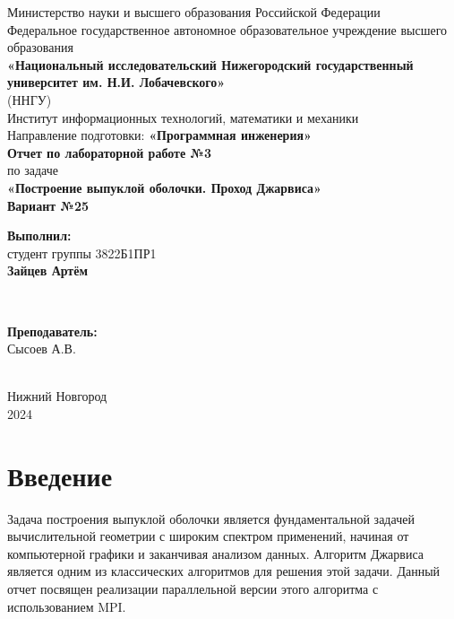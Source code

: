 \documentclass[12pt]{article}
\begin{document}
\begin{titlepage}
    \centering
    \large
    Министерство науки и высшего образования Российской Федерации\\[0.5cm]
    Федеральное государственное автономное образовательное учреждение высшего образования\\[0.5cm]
    \textbf{«Национальный исследовательский Нижегородский государственный университет им. Н.И. Лобачевского»}\\
    (ННГУ)\\[1cm]
    Институт информационных технологий, математики и механики\\[0.5cm]
    Направление подготовки: \textbf{«Программная инженерия»}\\[2cm]

    \vfill
    {\LARGE \textbf{Отчет по лабораторной работе №3}}\\[0.5cm]
    {\Large по задаче}\\[0.5cm]
    {\LARGE \textbf{«Построение выпуклой оболочки. Проход Джарвиса»}}\\[0.5cm]
    {\Large \textbf{Вариант №25}}\\[2.5cm]

    \hfill\parbox{0.5\textwidth}{
        \textbf{Выполнил:} \\
        студент группы 3822Б1ПР1 \\
        \textbf{Зайцев Артём}
    }\\[0.5cm]

    \hfill\parbox{0.5\textwidth}{
        \textbf{Преподаватель:} \\
        Сысоев А.В.

    }\\[2cm]

    Нижний Новгород\\
    2024
\end{titlepage}


\section{Введение}

Задача построения выпуклой оболочки является фундаментальной задачей вычислительной геометрии с широким спектром применений, начиная от компьютерной графики и заканчивая анализом данных. Алгоритм Джарвиса является одним из классических алгоритмов для решения этой задачи. Данный отчет посвящен реализации параллельной версии этого алгоритма с использованием MPI.
\end{document}
